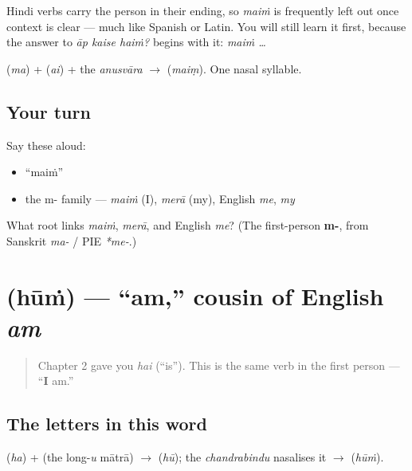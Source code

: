 \begin{grammarlens}[title={Grammar Lens: the pronoun you can often drop}]
Hindi verbs carry the person in their ending, so \emph{maiṁ} is frequently left out once context is clear — much like Spanish or Latin. You will still learn it first, because the answer to \emph{āp kaise haiṁ?} begins with it: \emph{maiṁ …}
\end{grammarlens}

\begin{sounds}
 (\emph{ma}) +  (\emph{ai}) + the \emph{anusvāra}  $\to$  (\emph{maiṃ}). One nasal syllable.
\end{sounds}

\subsection*{Your turn}
Say these aloud:

\begin{itemize}
\raggedright
  \item \textquotedblleft{}maiṁ\textquotedblright{}
  \item the m- family — \emph{maiṁ} (I), \emph{merā} (my), English \emph{me}, \emph{my}
\end{itemize}

\begin{tcolorbox}[breakable,colback=teal!4,colframe=teal!35!black,title={Before you move on}]
What root links \emph{maiṁ}, \emph{merā}, and English \emph{me}? (The first-person \textbf{m-}, from Sanskrit \emph{ma-} / PIE \emph{*me-}.)
\end{tcolorbox}
\section[\texorpdfstring{\hi{हूँ} (hūṁ)}{हूँ (hūṁ)}]{ (hūṁ) — \textquotedblleft{}am,\textquotedblright{} cousin of English \emph{am}}

\label{lesson:HI-C03-hun}



\begin{quote}
Chapter 2 gave you \emph{hai} (\textquotedblleft{}is\textquotedblright{}). This is the same verb in the first person — \textquotedblleft{}\textbf{I} am.\textquotedblright{}
\end{quote}

\subsection*{The letters in this word}
\textbf{} (\emph{ha}) + \textbf{} (the long-\emph{u} mātrā) $\to$ \textbf{} (\emph{hū}); the \emph{chandrabindu} \textbf{} nasalises it $\to$ \textbf{} (\emph{hūṁ}).

